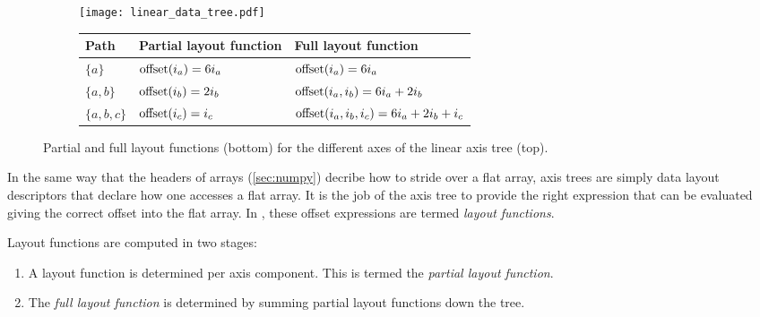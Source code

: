 \documentclass[thesis]{subfiles}
\begin{document}
\begin{figure}
  \centering

  \begin{subfigure}{.5\textwidth}
    \centering
    \texttt{[image: linear\_data\_tree.pdf]}
  \end{subfigure}

  \vspace{1em}

  \begin{subfigure}{\textwidth}
    \centering
    \begin{tabular}{|l|l|l|}
      \hline
      \textbf{Path} & \textbf{Partial layout function} & \textbf{Full layout function} \\
      \hline
      $\{a\}$ & $\textnormal{offset}(i_a) = 6 i_a$ & $\textnormal{offset}(i_a) = 6 i_a$ \\
      $\{a, b\}$ & $\textnormal{offset}(i_b) = 2 i_b$ & $\textnormal{offset}(i_a, i_b) = 6 i_a + 2 i_b$ \\
      $\{a, b, c\}$ & $\textnormal{offset}(i_c) = i_c$ & $\textnormal{offset}(i_a, i_b, i_c) = 6 i_a + 2 i_b + i_c$ \\
      \hline
    \end{tabular}
  \end{subfigure}
  \caption{
    Partial and full layout functions (bottom) for the different axes of the linear axis tree (top).
  }
  \label{fig:linear_axis_data_tree}
\end{figure}

In the same way that the headers of \numpy arrays (\cref{sec:numpy}) decribe how to stride over a flat array, axis trees are simply data layout descriptors that declare how one accesses a flat array.
It is the job of the axis tree to provide the right expression that can be evaluated giving the correct offset into the flat array.
In , these offset expressions are termed \textit{layout functions}.

Layout functions are computed in two stages:

\begin{enumerate}
  \item
    A layout function is determined per axis component.
    This is termed the \textit{partial layout function}.

  \item
    The \textit{full layout function} is determined by summing partial layout functions down the tree.
\end{enumerate}
\end{document}
